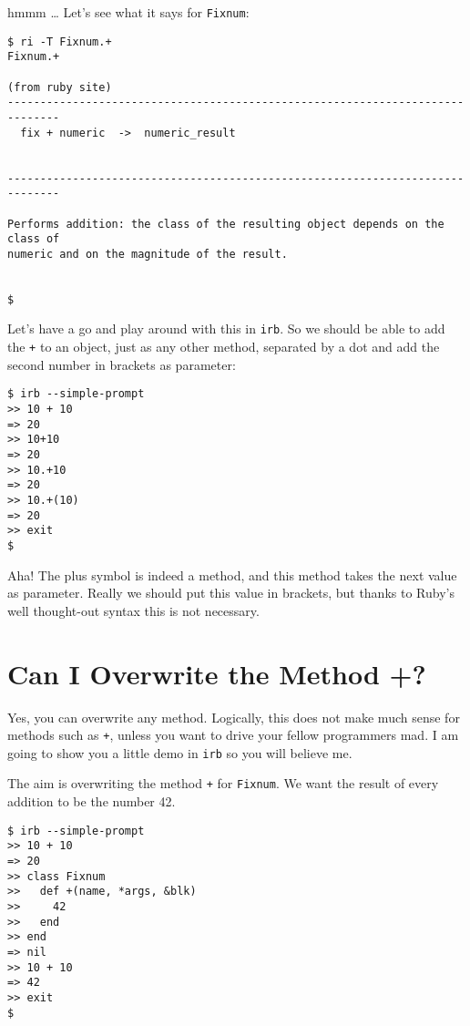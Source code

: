 \documentclass[a4paper]{book}
\begin{document}
hmmm \ldots{} Let's see what it says for \texttt{Fixnum}:

\begin{shaded}\begin{verbatim}
$ ri -T Fixnum.+
Fixnum.+

(from ruby site)
------------------------------------------------------------------------------
  fix + numeric  ->  numeric_result


------------------------------------------------------------------------------

Performs addition: the class of the resulting object depends on the class of
numeric and on the magnitude of the result.


$
\end{verbatim}\end{shaded}

Let's have a go and play around with this in \texttt{irb}. So we should be able to add the \texttt{+} to an object, just as any other method, separated by a dot and add the second number in brackets as parameter:

\begin{shaded}\begin{verbatim}
$ irb --simple-prompt
>> 10 + 10
=> 20
>> 10+10
=> 20
>> 10.+10
=> 20
>> 10.+(10)
=> 20
>> exit
$
\end{verbatim}\end{shaded}

Aha! The plus symbol is indeed a method, and this method takes the next value as parameter. Really we should put this value in brackets, but thanks to Ruby's well thought-out syntax this is not necessary.

\section{Can I Overwrite the Method +?}\label{can-i-overwrite-the-method}

Yes, you can overwrite any method. Logically, this does not make much sense for methods such as \texttt{+}, unless you want to drive your fellow programmers mad. I am going to show you a little demo in \texttt{irb} so you will believe me.

The aim is overwriting the method \texttt{+} for \texttt{Fixnum}. We want the result of every addition to be the number 42.

\begin{shaded}\begin{verbatim}
$ irb --simple-prompt
>> 10 + 10
=> 20
>> class Fixnum
>>   def +(name, *args, &blk)
>>     42
>>   end
>> end
=> nil
>> 10 + 10
=> 42
>> exit
$
\end{verbatim}\end{shaded}
\end{document}
